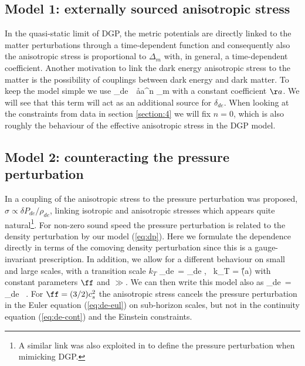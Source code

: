 \subsection{Model 1: externally sourced anisotropic stress}

In the quasi-static limit of DGP, the metric potentials are directly linked to 
the matter  perturbations through a time-dependent function \cite{Koyama:2005kd} 
and consequently also the anisotropic stress is proportional to $\Delta_m$ 
\cite{Kunz:2006ca} with, in general, a time-dependent coefficient. Another 
motivation to link the dark energy anisotropic stress to the matter is the 
possibility of couplings between dark energy and dark matter. To keep the model 
simple we use
\be
  \pi_{de}\ \equiv\  \aa a^n \Delta_m
\label{eq:model:1}
\ee
with a constant coefficient $\aa$. We will see that this term will act as an 
additional source for $\delta_{de}$. When looking at the constraints from 
data in section \ref{section:4} we will fix $n=0$, which is also roughly the behaviour of the effective
anisotropic stress in the DGP model.



\subsection{Model 2: counteracting the pressure perturbation}

In \cite{Song:2010rm} a coupling of the anisotropic stress to the pressure 
perturbation was proposed, $\sigma \propto \delta P_{de}/\rho_{de}$, linking 
isotropic and anisotropic stresses which appears quite natural\footnote{A similar 
link was also exploited in \cite{Kunz:2006ca} to define the pressure perturbation when mimicking DGP.}. For non-zero sound 
speed the pressure perturbation is related to the density perturbation by our 
model (\ref{eq:dp}). Here we formulate the dependence directly in terms of the 
comoving density perturbation since this is a gauge-invariant prescription. In 
addition, we allow for a different behaviour on small and large scales, with a 
transition scale $k_T$
\be
\pi_{de}\ = \ff {} \Delta_{de} \quad , \, k_T = \gg
\H(a)
\ee
with constant parameters $\ff$ and $\gg$. We can then write this model also as
\be
\pi_{de}\ =  \Delta_{de} \, .
\label{eq:model2}
\ee
For $\ff = (3/2) c_s^2$ the anisotropic stress cancels the pressure perturbation 
in the Euler equation (\ref{eq:de-eul}) on sub-horizon scales, but not in the 
continuity equation (\ref{eq:de-cont}) and the Einstein constraints.

